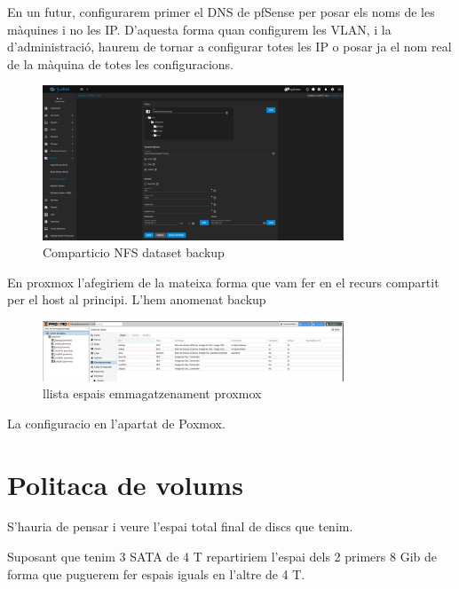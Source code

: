 \documentclass[
  10pt,
]{krantz}
\begin{document}
\begin{rmdinfo}{}
En un futur, configurarem primer el DNS de pfSense per posar els noms de les màquines i no les IP. D'aquesta forma quan configurem les VLAN, i la d'administració, haurem de tornar a configurar totes les IP o posar ja el nom real de la màquina de totes les configuracions.

\end{rmdinfo}

\begin{figure}
\centering
\includegraphics[width=0.8\textwidth,height=\textheight]{imatges/proxmox/NFS_backup.png}
\caption{Comparticio NFS dataset backup}
\end{figure}

En proxmox l'afegiriem de la mateixa forma que vam fer en el recurs compartit per el host al principi. L'hem anomenat backup

\begin{figure}
\centering
\includegraphics[width=0.8\textwidth,height=\textheight]{imatges/proxmox/llista_enma.png}
\caption{llista espais emmagatzenament proxmox}
\end{figure}

La configuracio en l'apartat de Poxmox.

\hypertarget{politaca-de-volums}{%
\section{Politaca de volums}\label{politaca-de-volums}}

S'hauria de pensar i veure l'espai total final de discs que tenim.

Suposant que tenim 3 SATA de 4 T repartiriem l'espai dels 2 primers 8 Gib de forma que puguerem fer espais iguals en l'altre de 4 T.
\end{document}
